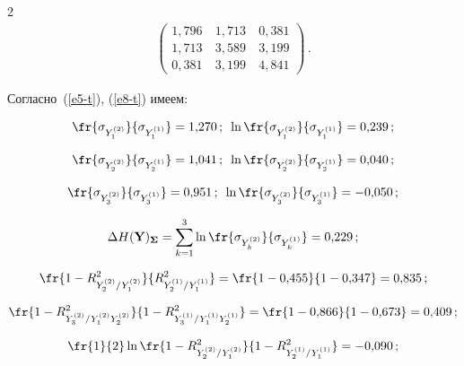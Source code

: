 \begin{multicols}{2}
\begin{align*}
\begin{pmatrix}
  1{,}796 &\ 1{,}713 &\ 0{,}381\\

  1{,}713 &\ 3{,}589&\ 3{,}199\\

  0{,}381&\ 3{,}199&\ 4{,}841 \end{pmatrix}\,.

  \end{align*}

  

  Согласно~(\ref{e5-t}), (\ref{e8-t}) имеем:

  $$

  \fr{\sigma_{Y_1^{(2)}}}{\sigma_{Y_1^{(1)}}} =1{,}270\,;\enskip 

  \ln \fr{\sigma_{Y_1^{(2)}}}{\sigma_{Y_1^{(1)}}}=0{,}239\,;

  $$

  $$

    \fr{\sigma_{Y_2^{(2)}}}{\sigma_{Y_2^{(1)}}} =1{,}041\,; \enskip

  \ln \fr{\sigma_{Y_2^{(2)}}}{\sigma_{Y_2^{(1)}}}=0{,}040\,;

  $$

  $$

    \fr{\sigma_{Y_3^{(2)}}}{\sigma_{Y_3^{(1)}}} =0{,}951\,;\enskip

  \ln \fr{\sigma_{Y_3^{(2)}}}{\sigma_{Y_3^{(1)}}}=-0{,}050\,;

  $$

  $$

  \Delta H(\mathbf{Y})_{\boldsymbol{\Sigma}} =\sum\limits_{k=1}^3 \ln 

\fr{\sigma_{Y_k^{(2)}}}{\sigma_{Y_k^{(1)}}} =0{,}229\,;

  $$

  $$

  \fr{1-R^2_{Y_2^{(2)}/Y_1^{(2)}}}{R^2_{Y_2^{(1)}/Y_1^{(1)}}} =\fr{1-

0{,}455}{1-0{,}347}=0{,}835\,;

  $$

  $$

  \fr{1-R^2_{Y_3^{(2)}/Y_1^{(2)}Y_2^{(2)}}}{1-R^2_{Y_3^{(1)}/Y_1^{(1)}Y_2^{(1)}}} 

=\fr{1-0{,}866}{1-0{,}673}=0{,}409\,;

  $$

  $$

  \fr{1}{2}\ln \fr{1-R^2_{Y_2^{(2)}/Y_1^{(2)}}}{1-

R^2_{Y_2^{(1)}/Y_1^{(1)}}} =-0{,}090\,;

  $$


\end{multicols}
